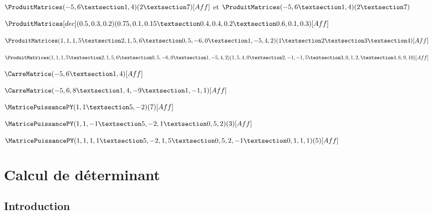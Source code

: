 \documentclass[french,a4paper,11pt]{article}
\begin{document}
\begin{PresentationCode}{}
$\ProduitMatrices(-5,6 § 1,4)(2 § 7)[Aff]$ et $\ProduitMatrices(-5,6 § 1,4)(2 § 7)$
\end{PresentationCode}

\begin{PresentationCode}{}
$\ProduitMatrices[dec](0.5,0.3,0.2)(0.75,0.1,0.15 § 0.4,0.4,0.2 § 0.6,0.1,0.3)[Aff]$
\end{PresentationCode}

\begin{PresentationCode}{}
$\ProduitMatrices(1,1,1,5 § 2,1,5,6 § 0,5,-6,0 § 1,-5,4,2)(1 § 2 § 3 § 4)[Aff]$
\end{PresentationCode}

\begin{PresentationCode}{}
$\ProduitMatrices%
	(1,1,1,5 § 2,1,5,6 § 0,5,-6,0 § 1,-5,4,2)%
	(1,5,4,0 § 2,-1,-1,5 § 3,0,1,2, § 4,6,9,10)
	[Aff]$
\end{PresentationCode}

\begin{PresentationCode}{}
$\CarreMatrice(-5,6 § 1,4)[Aff]$
\end{PresentationCode}

\begin{PresentationCode}{}
$\CarreMatrice(-5,6,8 § 1,4,-9 § 1,-1,1)[Aff]$
\end{PresentationCode}

\begin{PresentationCode}{}
$\MatricePuissancePY(1,1 § 5,-2)(7)[Aff]$
\end{PresentationCode}

\begin{PresentationCode}{}
$\MatricePuissancePY(1,1,-1 § 5,-2,1 § 0,5,2)(3)[Aff]$
\end{PresentationCode}

\begin{PresentationCode}{}
$\MatricePuissancePY(1,1,1,1 § 5,-2,1,5 § 0,5,2,-1 § 0,1,1,1)(5)[Aff]$
\end{PresentationCode}

\pagebreak

\section{Calcul de déterminant}

\subsection{Introduction}
\end{document}
